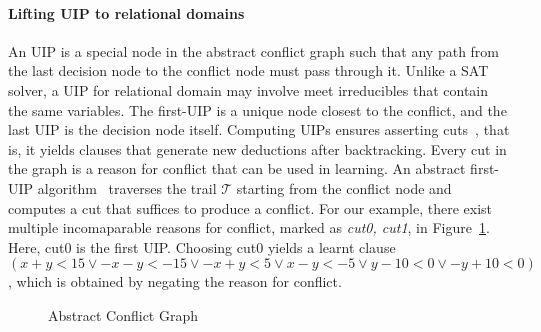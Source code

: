 \paragraph {\textbf{Lifting UIP to relational domains}}
An UIP is a special node in the abstract conflict graph such that 
any path from the last decision node to the conflict node must pass 
through it.  Unlike a SAT solver, a UIP for relational domain may 
involve meet irreducibles that contain the same variables.  The 
first-UIP is a unique node closest to the conflict, and the last UIP 
is the decision node itself.  Computing UIPs ensures asserting
cuts~\cite{cdcl,DBLP:journals/fmsd/BrainDGHK14}, that is, it 
yields clauses that generate new deductions after backtracking.  
Every cut in the graph is a reason for conflict that can be 
used in learning.  An abstract first-UIP algorithm~\cite{DBLP:journals/fmsd/BrainDGHK14} 
traverses the trail $\mathcal{T}$ starting from the conflict node and 
computes a cut that suffices to produce a conflict. 
For our example, there exist multiple incomaparable reasons for conflict,
marked as {\em cut0, cut1}, in Figure~\ref{conflict}.  Here, cut0 is the first UIP.  
Choosing cut0 yields a learnt clause 
$(x+y<15 \vee -x-y<-15 \vee -x+y<5 \vee x-y<-5 \vee y-10<0 \vee -y+10<0)$, 
which is obtained by negating the reason for conflict.  
%
\begin{figure}[t]
\caption{\label{conflict} Abstract Conflict Graph}
\end{figure} 
%    
